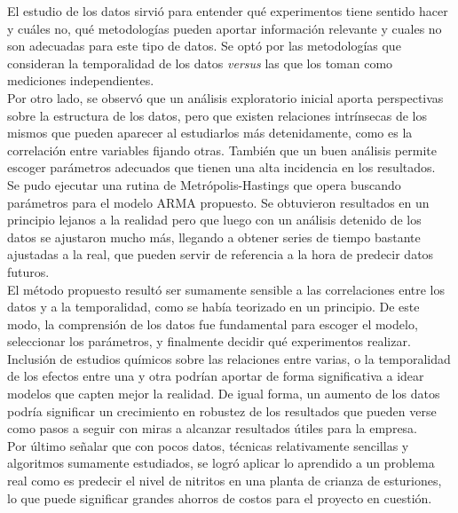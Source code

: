 \documentclass[letterpaper, 12pt]{article}
\begin{document}
El estudio de los datos sirvió para entender qué experimentos tiene sentido hacer y cuáles no, qué metodologías pueden aportar información relevante y cuales no son adecuadas para este tipo de datos. Se optó por las metodologías que consideran la temporalidad de los datos \textit{versus} las que los toman como mediciones independientes.\\


Por otro lado, se observó que un análisis exploratorio inicial aporta perspectivas sobre la estructura de los datos, pero que existen relaciones intrínsecas de los mismos que pueden aparecer al estudiarlos más detenidamente, como es la correlación entre variables fijando otras. También que un buen análisis permite escoger parámetros adecuados que tienen una alta incidencia en los resultados.\\

Se pudo ejecutar una rutina de Metrópolis-Hastings que opera buscando parámetros para el modelo ARMA propuesto. Se obtuvieron resultados en un principio lejanos a la realidad pero que luego con un análisis detenido de los datos se ajustaron mucho más, llegando a obtener series de tiempo bastante ajustadas a la real, que pueden servir de referencia a la hora de predecir datos futuros.\\

El método propuesto resultó ser sumamente sensible a las correlaciones entre los datos y a la temporalidad, como se había teorizado en un principio. De este modo, la comprensión de los datos fue fundamental para escoger el modelo, seleccionar los parámetros, y finalmente decidir qué experimentos realizar.\\

Inclusión de estudios químicos sobre las relaciones entre varias, o la temporalidad de los efectos entre una y otra podrían aportar de forma significativa a idear modelos que capten mejor la realidad. De igual forma, un aumento de los datos podría significar un crecimiento en robustez de los resultados que pueden verse como pasos a seguir con miras a alcanzar resultados útiles para la empresa.\\


Por último señalar que con pocos datos, técnicas relativamente sencillas y algoritmos sumamente estudiados, se logró aplicar lo aprendido a un problema real como es predecir el nivel de nitritos en una planta de crianza de esturiones, lo que puede significar grandes ahorros de costos para el proyecto en cuestión.
\end{document}
